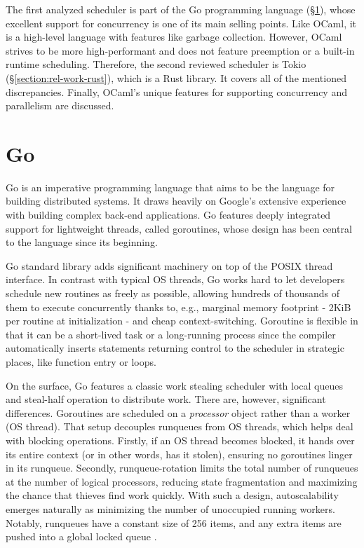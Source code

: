 \documentclass[12pt,a4paper,twoside]{report}
\begin{document}
The first analyzed scheduler is part of the Go programming language (\S\ref{section:rel-work-go}), whose excellent support for concurrency is one of its main selling points. Like OCaml, it is a high-level language with features like garbage collection. However, OCaml strives to be more high-performant and does not feature preemption or a built-in runtime scheduling. Therefore, the second reviewed scheduler is Tokio (\S\ref{section:rel-work-rust}), which is a Rust library. It covers all of the mentioned discrepancies. Finally, OCaml's unique features for supporting concurrency and parallelism are discussed. 

\section{Go}
\label{section:rel-work-go}
Go is an imperative programming language that aims to be the language for building distributed systems. It draws heavily on Google's extensive experience with building complex back-end applications. Go features deeply integrated support for lightweight threads, called goroutines, whose design has been central to the language since its beginning.

Go standard library adds significant machinery on top of the POSIX thread interface. In contrast with typical OS threads, Go works hard to let developers schedule new routines as freely as possible, allowing hundreds of thousands of them to execute concurrently thanks to, e.g., marginal memory footprint - 2KiB per routine at initialization - and cheap context-switching. Goroutine is flexible in that it can be a short-lived task or a long-running process since the compiler automatically inserts statements returning control to the scheduler in strategic places, like function entry or loops. 

On the surface, Go features a classic work stealing scheduler with local queues and steal-half operation to distribute work. There are, however, significant differences. Goroutines are scheduled on a \textit{processor} object rather than a worker (OS thread). That setup decouples runqueues from OS threads, which helps deal with blocking operations. Firstly, if an OS thread becomes blocked, it hands over its entire context (or in other words, has it stolen), ensuring no goroutines linger in its runqueue. Secondly, runqueue-rotation limits the total number of runqueues at the number of logical processors, reducing state fragmentation and maximizing the chance that thieves find work quickly. With such a design, autoscalability emerges naturally as minimizing the number of unoccupied running workers. Notably, runqueues have a constant size of 256 items, and any extra items are pushed into a global locked queue \cite{goprocgo7:online}. 
\end{document}
